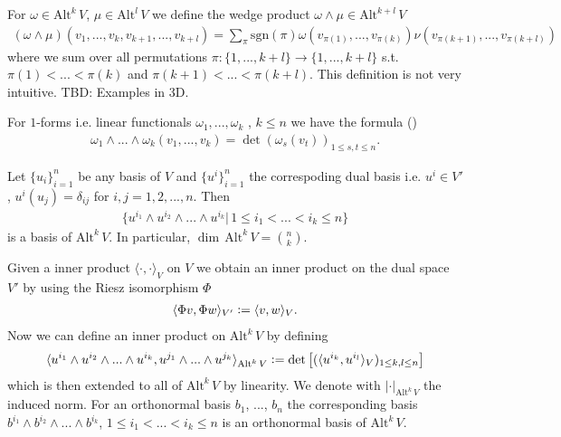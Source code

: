 \documentclass[12pt,a4paper]{article}
\numberwithin{equation}{subsection}
\numberwithin{lemma}{subsection}
\theoremstyle{definition}
\newcommand{\alternating}[2]{ {\text{Alt}^{#1}\,#2} }
\begin{document}
For $\omega \in 
\alternating{k}{V}$, $\mu \in 
\alternating{l}{V}$ we define the wedge product $\omega \wedge \mu \in 
\alternating{k+l}{V}$ 
\begin{align*}
    (\omega \wedge \mu) (v_1,...,v_k,v_{k+1},...,v_{k+l}) =
    \sum\limits_\pi
    \text{sgn}(\pi) \omega(v_{\pi(1)},...,v_{\pi(k)}) 
    \nu(v_{\pi(k+1)},...,v_{\pi(k+l)})
\end{align*}
where we sum over all permutations 
$\pi: \{1,...,k+l\} \rightarrow \{1,...,k+l\}$ 
s.t. $\pi(1) < ... < \pi(k)$ and $\pi(k+1) < ... < \pi(k+l)$.
This definition is not very intuitive.
{\color{red} TBD: Examples in 3D}.

For $1$-forms i.e. linear functionals $\omega_1,...,\omega_k$ 
, $k \leq n$ we have the formula (\cite[p.260]{topology_and_geometry})
\begin{align}
    \omega_1 \wedge ... \wedge \omega_k (v_1,...,v_k)
    = \det (\omega_s(v_t))_{1\leq s,t \leq n}. 
    \label{eq:wedge_product_of_one_forms}
\end{align}

Let $\{ u_i\}_{i=1}^n$ be any basis of $V$ and $\{ u^i\}_{i=1}^n$ the 
correspoding dual basis i.e. 
$u^i \in V'$, $u^i(u_j) = \delta_{ij}$ for $i,j = 1,2,..., n$. Then 
\begin{align*}
    \{u^{i_1} \wedge u^{i_2} \wedge ... \wedge u^{i_k} | \, 
    1 \leq i_1 < ... < i_k \leq n \}
\end{align*}
is a basis of $\alternating{k}{V}$. In particular, 
$\dim\, \alternating{k}{V} = \binom{n}{k}$.

Given a inner product $\langle\cdot, \cdot \rangle_V$ on $V$ we obtain an inner 
product on the dual space $V'$ by using the Riesz isomorphism $\Phi$ 
\begin{align*}
    \langle \Phi v, \Phi w \rangle_{V'} \vcentcolon= \langle v, w \rangle_V.
\end{align*}
Now we can define an inner product on $\alternating{k}{V}$ by defining
\begin{align*}
    \langle u^{i_1} \wedge u^{i_2} \wedge... \wedge u^{i_k}, 
    u^{j_1} \wedge... \wedge u^{j_k} \rangle_{\alternating{k}{V}} 
    \vcentcolon= \det \left[ ( \langle u^{i_k}, u^{i_l} \rangle_V )_
    {1\leq k,l \leq n} \right] 
\end{align*}
which is then extended to all of $\alternating{k}{V}$ by linearity. 
We denote with $\lvert \cdot \rvert _\alternating{k}{V}$ the induced norm.
For an orthonormal basis 
$b_1$, ..., $b_n$ the corresponding basis 
$b^{i_1} \wedge b^{i_2} \wedge ... \wedge b^{i_k}$, 
$1\leq i_1 < ... < i_k \leq n$ is an orthonormal basis of $\alternating{k}{V}$.
\end{document}
